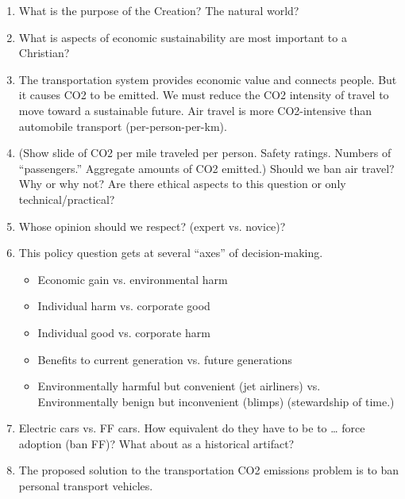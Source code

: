 \documentclass[12pt]{article}
\begin{document}
\begin{enumerate}
  \item What is the purpose of the Creation? The natural world?

  \item What is aspects of economic sustainability are most important to a Christian?


\item The transportation system provides economic value and connects people. But it causes CO2 to be emitted. We must reduce the CO2 intensity of travel to move toward a sustainable future. Air travel is more CO2-intensive than automobile transport (per-person-per-km). 

\item (Show slide of CO2 per mile traveled per person. Safety ratings. Numbers of “passengers.” Aggregate amounts of CO2 emitted.) Should we ban air travel? Why or why not? Are there ethical aspects to this question or only technical/practical? 

\item Whose opinion should we respect? (expert vs. novice)?

\item This policy question gets at several “axes” of decision-making.
\begin{itemize}
\item Economic gain vs. environmental harm
\item Individual harm vs. corporate good
\item Individual good vs. corporate harm
\item Benefits to current generation vs. future generations
\item Environmentally harmful but convenient (jet airliners) vs. Environmentally benign but inconvenient (blimps) (stewardship of time.)
\end{itemize}


\item Electric cars vs. FF cars. How equivalent do they have to be to … force adoption (ban FF)? What about as a historical artifact?

\item The proposed solution to the transportation CO2 emissions problem is to ban personal transport vehicles.


\end{enumerate}
\end{document}
